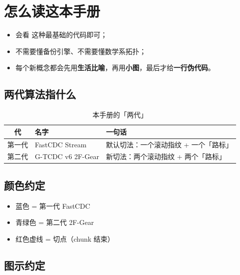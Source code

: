 \chapter*{怎么读这本手册}

\begin{beginnerbox}[你需要的背景]
\begin{itemize}[nosep]
  \item 会看  这种最基础的代码即可；
  \item 不需要懂备份引擎、不需要懂数学系拓扑；
  \item 每个新概念都会先用\textbf{生活比喻}，再用\textbf{小图}，最后才给\textbf{一行伪代码}。
\end{itemize}
\end{beginnerbox}

\section*{两代算法指什么}

\begin{table}[htbp]
\centering
\caption{本手册的「两代」}
\begin{tabular}{@{}cll@{}}
\toprule
\textbf{代} & \textbf{名字} & \textbf{一句话} \\
\midrule
第一代 & FastCDC Stream & 默认切法：一个滚动指纹 + 一个「路标」 \\
第二代 & G-TCDC v6 2F-Gear & 新切法：两个滚动指纹 + 两个「路标」 \\
\bottomrule
\end{tabular}
\end{table}

\section*{颜色约定}

\begin{itemize}[nosep]
  \item \textcolor{Gen1Blue}{蓝色} = 第一代 FastCDC
  \item \textcolor{Gen2Teal}{青绿色} = 第二代 2F-Gear
  \item \textcolor{CutRed}{红色虚线} = 切点（chunk 结束）
\end{itemize}

\section*{图示约定}

